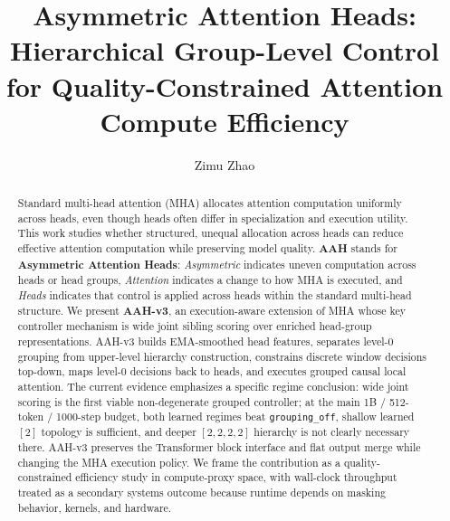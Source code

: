 \documentclass[11pt]{article}
\title{Asymmetric Attention Heads: Hierarchical Group-Level Control for Quality-Constrained Attention Compute Efficiency}
\author{Zimu Zhao}
\date{}
\begin{document}
\maketitle

\begin{abstract}
  Standard multi-head attention (MHA) allocates attention computation uniformly across heads, even though heads often differ in specialization and execution utility. This work studies whether structured, unequal allocation across heads can reduce effective attention computation while preserving model quality. \textbf{AAH} stands for \textbf{Asymmetric Attention Heads}: \emph{Asymmetric} indicates uneven computation across heads or head groups, \emph{Attention} indicates a change to how MHA is executed, and \emph{Heads} indicates that control is applied across heads within the standard multi-head structure. We present \textbf{AAH-v3}, an execution-aware extension of MHA whose key controller mechanism is wide joint sibling scoring over enriched head-group representations. AAH-v3 builds EMA-smoothed head features, separates level-0 grouping from upper-level hierarchy construction, constrains discrete window decisions top-down, maps level-0 decisions back to heads, and executes grouped causal local attention. The current evidence emphasizes a specific regime conclusion: wide joint scoring is the first viable non-degenerate grouped controller; at the main 1B / 512-token / 1000-step budget, both learned regimes beat \texttt{grouping\_off}, shallow learned \([2]\) topology is sufficient, and deeper \([2,2,2,2]\) hierarchy is not clearly necessary there. AAH-v3 preserves the Transformer block interface and flat output merge while changing the MHA execution policy. We frame the contribution as a quality-constrained efficiency study in compute-proxy space, with wall-clock throughput treated as a secondary systems outcome because runtime depends on masking behavior, kernels, and hardware.
\end{abstract}
\end{document}
